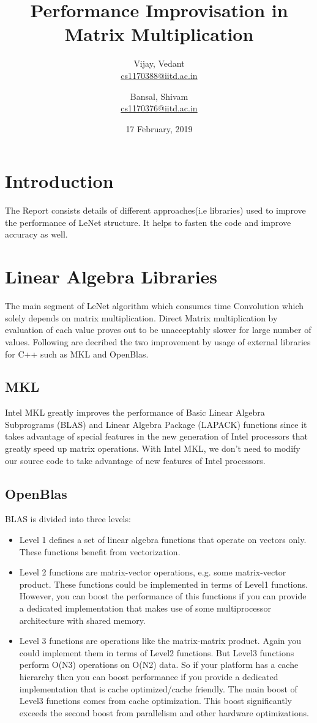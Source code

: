 \documentclass[14pt]{extarticle}
\title{ {\huge Performance Improvisation in Matrix Multiplication}}
\author{{\huge Vijay, Vedant} \\  \href{mailto:Vvijay1000@gmail.com}{cs1170388@iitd.ac.in} 
   \and {\huge Bansal, Shivam} \\  \href{mailto:cs1170376@iitd.ac.in}{cs1170376@iitd.ac.in} }
\date{17 February, 2019}
\begin{document}
\maketitle
\newpage
\section{Introduction}
The Report consists details of different approaches(i.e libraries) used to improve the performance of LeNet structure. It helps to fasten the code and improve accuracy as well. 
\section{Linear Algebra Libraries}
The main segment of LeNet algorithm which consumes time Convolution which solely depends on matrix multiplication. Direct Matrix multiplication by evaluation of each value proves out to be unacceptably slower for large number of values. Following are decribed the two improvement by usage of external libraries for C++ such as MKL and OpenBlas.
\subsection{MKL }
\cite{IntelMKL1}
Intel MKL greatly improves the performance of Basic Linear Algebra Subprograms (BLAS) and Linear Algebra Package (LAPACK) functions since it takes advantage of special features in the new generation of Intel processors that greatly speed up matrix operations. With Intel MKL, we don’t need to modify our source code to take advantage of new features of Intel processors. 
\subsection{OpenBlas \cite{OpenBLAS}}
BLAS is divided into three levels:
\begin{itemize}
\item Level 1 defines a set of linear algebra functions that operate on vectors only. These functions benefit from vectorization.
\item Level 2 functions are matrix-vector operations, e.g. some matrix-vector product. These functions could be implemented in terms of Level1 functions. However, you can boost the performance of this functions if you can provide a dedicated implementation that makes use of some multiprocessor architecture with shared memory.
\item Level 3 functions are operations like the matrix-matrix product. Again you could implement them in terms of Level2 functions. But Level3 functions perform O(N3) operations on O(N2) data. So if your platform has a cache hierarchy then you can boost performance if you provide a dedicated implementation that is cache optimized/cache friendly. The main boost of Level3 functions comes from cache optimization. This boost significantly exceeds the second boost from parallelism and other hardware optimizations. 
\end{itemize}
\end{document}
